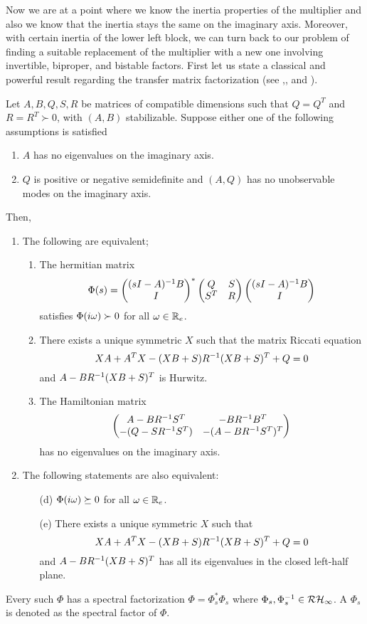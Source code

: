Now we are at a point where we know the inertia properties of the multiplier and also we know that the
inertia stays the same on the imaginary axis. Moreover, with certain inertia of the lower left block,
we can turn back to our problem of finding a suitable replacement of the multiplier with a new one involving 
invertible, biproper, and bistable factors. First let us state a classical and powerful result regarding the 
transfer matrix factorization (see \cite[Thm. 13.19]{zhoubook},\cite[Thm. 7.3]{francis}, and \cite[Thm. 2]{youla}).

\begin{thm}\label{thm:zhouspecfact}Let $A,B,Q,S,R$ be matrices of compatible dimensions such that $Q=Q^T$ and $R=R^T\succ 0$, with
$(A,B)$ stabilizable. Suppose either one of the following assumptions is satisfied
\begin{enumerate}[label=(A\arabic*)]
	\item $A$ has no eigenvalues on the imaginary axis.
	\item $Q$ is positive or negative semidefinite and $(A,Q)$ has no unobservable modes on the imaginary axis.
\end{enumerate}
Then,
\begin{enumerate}[label=(\Roman*)] 
\item The following are equivalent;
  \begin{enumerate}[label=(\alph*)]
		\item The hermitian matrix 
		\[
		\Phi(s) = \begin{pmatrix}(sI-A)^{-1}B\\ I\end{pmatrix}^*\begin{pmatrix}Q&S\\S^T&R\end{pmatrix}\begin{pmatrix}(sI-A)^{-1}B\\ I\end{pmatrix}
		\]
		satisfies $\Phi(i\omega)\succ 0$ for all $\omega\in\mathbb{R}_e$.
		\item There exists a unique symmetric $X$ such that the matrix Riccati equation
		\[
		XA + A^TX - (XB+S)R^{-1}(XB+S)^T + Q = 0
		\]
		and $A-BR^{-1}(XB+S)^T$ is Hurwitz.
		\item The Hamiltonian matrix 
		\[
		\begin{pmatrix}A-BR^{-1}S^T & -BR^{-1}B^T\\-(Q-SR^{-1}S^T) &-(A-BR^{-1}S^T)^T\end{pmatrix}
		\]
		has no eigenvalues on the imaginary axis. 
		\end{enumerate}
		\item The following statements are also equivalent:
		\begin{enumerate}
		\item[(d)] $\Phi(i\omega) \succeq 0$ for all $\omega\in\mathbb{R}_e$.
		\item[(e)] There exists a unique symmetric $X$ such that 
		\[
		XA + A^TX - (XB+S)R^{-1}(XB+S)^T + Q = 0
		\]
		and $A-BR^{-1}(XB+S)^T$ has all its eigenvalues in the closed left-half plane.
		\end{enumerate}
\end{enumerate}
Every such $\Phi$ has a spectral factorization $\Phi = \Phi_s^*\Phi_s$ where $\Phi_s,\Phi_s^{-1}\in\mathcal{RH}_\infty$. 
A $\Phi_s$ is denoted as the spectral factor of $\Phi$. 
\end{thm}
